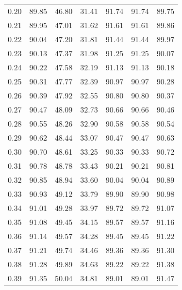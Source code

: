 \begin{tabular}{|c|c|c|c|c|c|c|}
      0.20 &     89.85 &     46.80 &      31.41 &   91.74 &      91.74 &         89.75 \\
      0.21 &     89.95 &     47.01 &      31.62 &   91.61 &      91.61 &         89.86 \\
      0.22 &     90.04 &     47.20 &      31.81 &   91.44 &      91.44 &         89.97 \\
      0.23 &     90.13 &     47.37 &      31.98 &   91.25 &      91.25 &         90.07 \\
      0.24 &     90.22 &     47.58 &      32.19 &   91.13 &      91.13 &         90.18 \\
      0.25 &     90.31 &     47.77 &      32.39 &   90.97 &      90.97 &         90.28 \\
      0.26 &     90.39 &     47.92 &      32.55 &   90.80 &      90.80 &         90.37 \\
      0.27 &     90.47 &     48.09 &      32.73 &   90.66 &      90.66 &         90.46 \\
      0.28 &     90.55 &     48.26 &      32.90 &   90.58 &      90.58 &         90.54 \\
      0.29 &     90.62 &     48.44 &      33.07 &   90.47 &      90.47 &         90.63 \\
      0.30 &     90.70 &     48.61 &      33.25 &   90.33 &      90.33 &         90.72 \\
      0.31 &     90.78 &     48.78 &      33.43 &   90.21 &      90.21 &         90.81 \\
      0.32 &     90.85 &     48.94 &      33.60 &   90.04 &      90.04 &         90.89 \\
      0.33 &     90.93 &     49.12 &      33.79 &   89.90 &      89.90 &         90.98 \\
      0.34 &     91.01 &     49.28 &      33.97 &   89.72 &      89.72 &         91.07 \\
      0.35 &     91.08 &     49.45 &      34.15 &   89.57 &      89.57 &         91.16 \\
      0.36 &     91.14 &     49.57 &      34.28 &   89.45 &      89.45 &         91.22 \\
      0.37 &     91.21 &     49.74 &      34.46 &   89.36 &      89.36 &         91.30 \\
      0.38 &     91.28 &     49.89 &      34.63 &   89.22 &      89.22 &         91.38 \\
      0.39 &     91.35 &     50.04 &      34.81 &   89.01 &      89.01 &         91.47 \\

\end{tabular}
